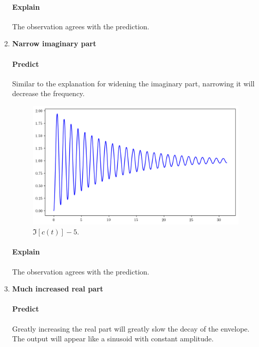 \documentclass[12pt,a4paper,twoside]{article}
\begin{document}
\begin{enumerate}[(1)]
\paragraph{Explain} The observation agrees with the prediction.

\clearpage
\item \textbf{Narrow imaginary part}

\paragraph{Predict} Similar to the explanation for widening the imaginary part, narrowing it will decrease the frequency.

\begin{figure}[!h]
	\centering
	\includegraphics[width=\textwidth]{minusimag.png}
	\caption{$\Im[c(t)] - 5$.}
	\label{fig:minusimag}
\end{figure}

\paragraph{Explain} The observation agrees with the prediction.

\clearpage
\item \textbf{Much increased real part}

\paragraph{Predict} Greatly increasing the real part will greatly slow the decay of the envelope. The output will appear like a sinusoid with constant amplitude.


\end{enumerate}
\end{document}
